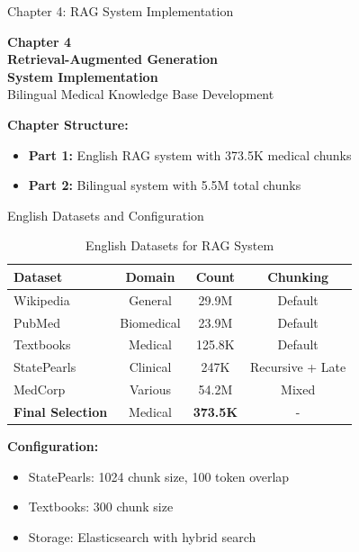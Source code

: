 \begin{frame}{Chapter 4: RAG System Implementation}
    \begin{center}
        \Large{\textbf{Chapter 4}}\\
        \vspace{0.5em}
        \huge{\textbf{Retrieval-Augmented Generation}}\\
        \huge{\textbf{System Implementation}}\\
        \vspace{0.5em}
        \large{Bilingual Medical Knowledge Base Development}
    \end{center}
    
    \vspace{0.5em}
    
    \textbf{Chapter Structure:}
    \begin{itemize}
        \item \textbf{Part 1:} English RAG system with 373.5K medical chunks
        \item \textbf{Part 2:} Bilingual system with 5.5M total chunks
    \end{itemize}
\end{frame}

\begin{frame}{English Datasets and Configuration}
    \begin{table}[h]
        \centering
        \footnotesize
        \caption{English Datasets for RAG System}
        \begin{tabular}{lccc}
            \toprule
            \textbf{Dataset} & \textbf{Domain} & \textbf{Count} & \textbf{Chunking} \\
            \midrule
            Wikipedia & General & 29.9M & Default \\
            PubMed & Biomedical & 23.9M & Default \\
            Textbooks & Medical & 125.8K & Default \\
            StatePearls & Clinical & 247K & Recursive + Late \\
            MedCorp & Various & 54.2M & Mixed \\
            \midrule
            \rowcolor{improvement!20} \textbf{Final Selection} & Medical & \textbf{373.5K} & - \\
            \bottomrule
        \end{tabular}
    \end{table}
    
    \textbf{Configuration:}
    \begin{itemize}
        \item StatePearls: 1024 chunk size, 100 token overlap
        \item Textbooks: 300 chunk size
        \item Storage: Elasticsearch with hybrid search
    \end{itemize}
\end{frame}

